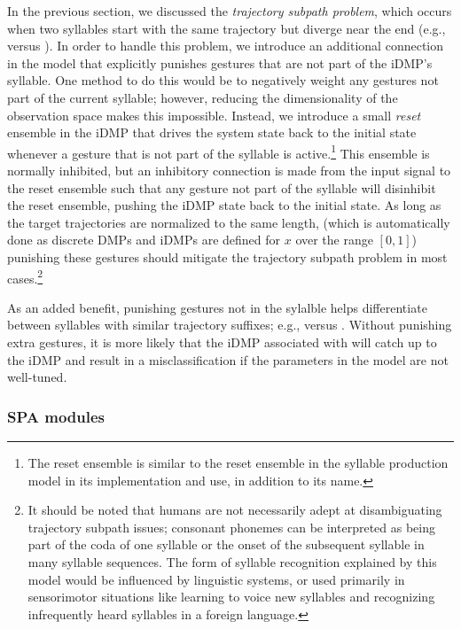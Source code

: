 In the previous section, we discussed
the \textit{trajectory subpath problem},
which occurs when two syllables
start with the same trajectory
but diverge near the end
(e.g., \ipa{[bA]} versus \ipa{[bAr]}).
In order to handle this problem,
we introduce an additional connection
in the model that explicitly punishes
gestures that are not
part of the iDMP's syllable.
One method to do this would be to
negatively weight any gestures
not part of the current syllable;
however, reducing the dimensionality
of the observation space makes
this impossible.
Instead, we introduce a small \textit{reset} ensemble
in the iDMP that drives
the system state back to the initial state
whenever a gesture that is not part
of the syllable is active.\footnote{
  The reset ensemble is similar to the reset ensemble
  in the syllable production model
  in its implementation and use,
  in addition to its name.}
This ensemble is normally inhibited,
but an inhibitory connection is made
from the input signal to the reset ensemble
such that any gesture
not part of the syllable will
disinhibit the reset ensemble,
pushing the iDMP state back to the initial state.
As long as the target trajectories
are normalized to the same length,
(which is automatically done
as discrete DMPs and iDMPs
are defined for $x$ over the range $[0, 1]$)
punishing these gestures should
mitigate the trajectory subpath problem
in most cases.\footnote{
  It should be noted that humans
  are not necessarily adept at
  disambiguating trajectory subpath issues;
  consonant phonemes can be interpreted
  as being part of the coda of one syllable
  or the onset of the subsequent syllable
  in many syllable sequences.
  The form of syllable recognition
  explained by this model would
  be influenced by linguistic systems,
  or used primarily in sensorimotor situations
  like learning to voice new syllables
  and recognizing infrequently heard syllables
  in a foreign language.}

As an added benefit,
punishing gestures not in the sylalble helps
differentiate between syllables with
similar trajectory suffixes;
e.g., \ipa{[bAr]} versus \ipa{[dAr]}.
Without punishing extra gestures,
it is more likely that the iDMP
associated with \ipa{[dAr]} will catch up
to the \ipa{[bAr]} iDMP
and result in a misclassification
if the parameters in the model
are not well-tuned.

\subsubsection{SPA modules}

